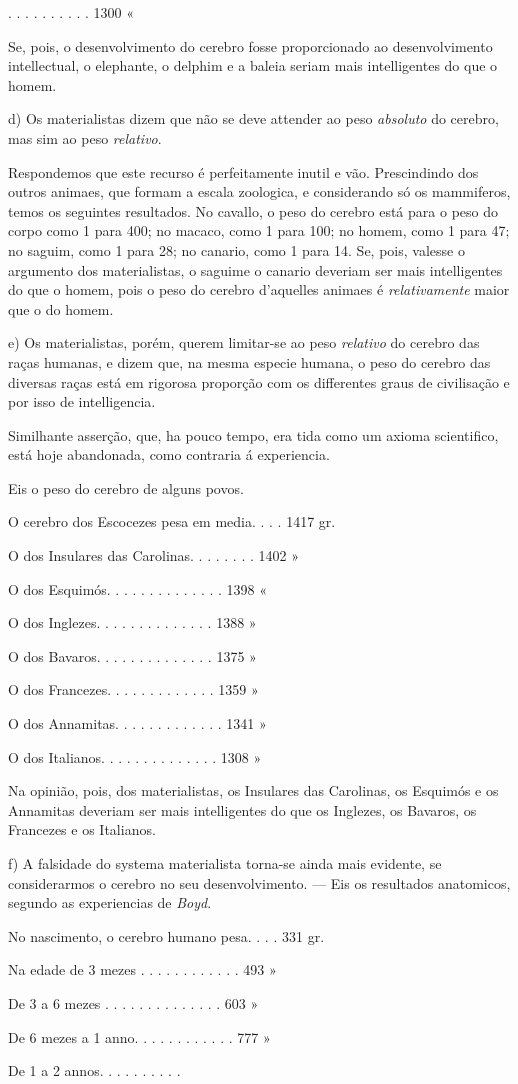 . . . . . . . . . . 1300 «\par Se, pois, o desenvolvimento do cerebro fosse proporcionado ao desenvolvimento intellectual, o elephante, o delphim e a baleia seriam mais intelligentes do que o homem.\par d) Os materialistas dizem que não se deve attender ao peso \emph{absoluto} do cerebro, mas sim ao peso \emph{relativo}.\par Respondemos que este recurso é perfeitamente inutil e vão. Prescindindo dos outros animaes, que formam a escala zoologica, e considerando só os mammiferos, temos os seguintes resultados. No cavallo, o peso do cerebro está para o peso do corpo como 1 para 400; no macaco, como 1 para 100; no homem, como 1 para 47; no saguim, como 1 para 28; no canario, como 1 para 14. Se, pois, valesse o argumento dos materialistas, o saguime o canario deveriam ser mais intelligentes do que o homem, pois o peso do cerebro d'aquelles animaes é \emph{relativamente} maior que o do homem.\par e) Os materialistas, porém, querem limitar-se ao peso \emph{relativo} do cerebro das raças humanas, e dizem que, na mesma especie humana, o peso do cerebro das diversas raças está em rigorosa proporção com os differentes graus de civilisação e por isso de intelligencia.\par Similhante asserção, que, ha pouco tempo, era tida como um axioma scientifico, está hoje abandonada, como contraria á experiencia.\par Eis o peso do cerebro de alguns povos.\par O cerebro dos Escocezes pesa em media. . . . 1417 gr.\par O dos Insulares das Carolinas. . . . . . . . 1402 »\par O dos Esquimós. . . . . . . . . . . . . . 1398 «\par O dos Inglezes. . . . . . . . . . . . . . 1388 »\par O dos Bavaros. . . . . . . . . . . . . . 1375 »\par O dos Francezes. . . . . . . . . . . . . 1359 »\par O dos Annamitas. . . . . . . . . . . . . 1341 »\par O dos Italianos. . . . . . . . . . . . . . 1308 »\par Na opinião, pois, dos materialistas, os Insulares das Carolinas, os Esquimós e os Annamitas deveriam ser mais intelligentes do que os Inglezes, os Bavaros, os Francezes e os Italianos.\par f) A falsidade do systema materialista torna-se ainda mais evidente, se considerarmos o cerebro no seu desenvolvimento. --- Eis os resultados anatomicos, segundo as experiencias de \emph{Boyd}.\par No nascimento, o cerebro humano pesa. . . . 331 gr.\par Na edade de 3 mezes . . . . . . . . . . . . 493 »\par De 3 a 6 mezes . . . . . . . . . . . . . . 603 »\par De 6 mezes a 1 anno. . . . . . . . . . . . 777 »\par De 1 a 2 annos. . . . . . . . . . 